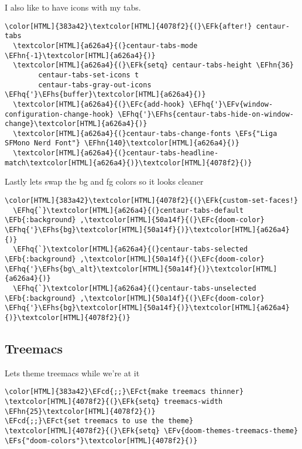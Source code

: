 \documentclass{scrartcl}
\newcommand{\EFk}[1]{\textcolor{EFk}{#1}} %
\newcommand{\EFs}[1]{\textcolor{EFs}{#1}} %
\newcommand{\EFb}[1]{\textcolor{EFb}{#1}} %
\newcommand{\EFct}[1]{\textcolor{EFct}{#1}} %
\newcommand{\EFc}[1]{\textcolor{EFc}{#1}} %
\newcommand{\EFv}[1]{\textcolor{EFv}{#1}} %
\newcommand{\EFcd}[1]{\textcolor{EFcd}{#1}} %
\newcommand{\EFhn}[1]{\textcolor{EFhn}{\textbf{#1}}} %
\newcommand{\EFhq}[1]{\textcolor{EFhq}{#1}} %
\newcommand{\EFhs}[1]{\textcolor{EFhs}{#1}} %
\begin{document}
I also like to have icons with my tabs.
\begin{Code}
\begin{Verbatim}[]
\color[HTML]{383a42}\textcolor[HTML]{4078f2}{(}\EFk{after!} centaur-tabs
  \textcolor[HTML]{a626a4}{(}centaur-tabs-mode \EFhn{-1}\textcolor[HTML]{a626a4}{)}
  \textcolor[HTML]{a626a4}{(}\EFk{setq} centaur-tabs-height \EFhn{36}
        centaur-tabs-set-icons t
        centaur-tabs-gray-out-icons \EFhq{'}\EFhs{buffer}\textcolor[HTML]{a626a4}{)}
  \textcolor[HTML]{a626a4}{(}\EFc{add-hook} \EFhq{'}\EFv{window-configuration-change-hook} \EFhq{'}\EFhs{centaur-tabs-hide-on-window-change}\textcolor[HTML]{a626a4}{)}
  \textcolor[HTML]{a626a4}{(}centaur-tabs-change-fonts \EFs{"Liga SFMono Nerd Font"} \EFhn{140}\textcolor[HTML]{a626a4}{)}
  \textcolor[HTML]{a626a4}{(}centaur-tabs-headline-match\textcolor[HTML]{a626a4}{)}\textcolor[HTML]{4078f2}{)}
\end{Verbatim}
\end{Code}

Lastly lets swap the bg and fg colors so it looks cleaner
\begin{Code}
\begin{Verbatim}[]
\color[HTML]{383a42}\textcolor[HTML]{4078f2}{(}\EFk{custom-set-faces!}
  \EFhq{`}\textcolor[HTML]{a626a4}{(}centaur-tabs-default \EFb{:background} ,\textcolor[HTML]{50a14f}{(}\EFc{doom-color} \EFhq{'}\EFhs{bg}\textcolor[HTML]{50a14f}{)}\textcolor[HTML]{a626a4}{)}
  \EFhq{`}\textcolor[HTML]{a626a4}{(}centaur-tabs-selected \EFb{:background} ,\textcolor[HTML]{50a14f}{(}\EFc{doom-color} \EFhq{'}\EFhs{bg\_alt}\textcolor[HTML]{50a14f}{)}\textcolor[HTML]{a626a4}{)}
  \EFhq{`}\textcolor[HTML]{a626a4}{(}centaur-tabs-unselected \EFb{:background} ,\textcolor[HTML]{50a14f}{(}\EFc{doom-color} \EFhq{'}\EFhs{bg}\textcolor[HTML]{50a14f}{)}\textcolor[HTML]{a626a4}{)}\textcolor[HTML]{4078f2}{)}
\end{Verbatim}
\end{Code}

\subsection{Treemacs}
\label{sec:orgd045027}
Lets theme treemacs while we're at it
\begin{Code}
\begin{Verbatim}[]
\color[HTML]{383a42}\EFcd{;;}\EFct{make treemacs thinner}
\textcolor[HTML]{4078f2}{(}\EFk{setq} treemacs-width \EFhn{25}\textcolor[HTML]{4078f2}{)}
\EFcd{;;}\EFct{set treemacs to use the theme}
\textcolor[HTML]{4078f2}{(}\EFk{setq} \EFv{doom-themes-treemacs-theme} \EFs{"doom-colors"}\textcolor[HTML]{4078f2}{)}
\end{Verbatim}
\end{Code}
\end{document}
